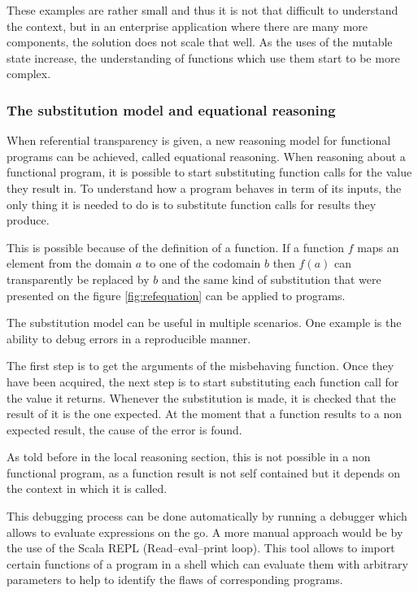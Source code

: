 \documentclass[../main.tex]{subfiles}
\begin{document}


These examples are rather small and thus it is not that difficult to understand
the context, but in an enterprise application where there are many more
components, the solution does not scale that well. As the uses of the mutable
state increase, the understanding of functions which use them start to be more
complex.

\subsubsection{The substitution model and equational reasoning}

When referential transparency is given, a new reasoning model for functional
programs can be achieved, called equational reasoning. When reasoning about a
functional program, it is possible to start substituting function calls for the
value they result in. To understand how a program behaves in term of its inputs,
the only thing it is needed to do is to substitute function calls for results they
produce.

This is possible because of the definition of a function. If a function $f$ maps an
element from the domain $a$ to one of the codomain $b$ then $f(a)$ can
transparently be replaced by $b$ and the same kind of substitution that were
presented on the figure \ref{fig:refequation} can be applied to programs.

The substitution model can be useful in multiple scenarios. One example is the
ability to debug errors in a reproducible manner.

The first step is to get the arguments of the misbehaving function. Once they have been acquired, the next step is to
start substituting each function call for the value it returns. Whenever the
substitution is made, it is checked that the result of it is the one expected. At the
moment that a function results to a non expected result, the cause of the error
is found.

As told before in the local reasoning section, this is not possible in a non
functional program, as a function result is not self contained but it depends on
the context in which it is called.

This debugging process can be done automatically by running a debugger which allows to
evaluate expressions on the go. A more manual approach would be by the use of
the Scala REPL (Read–eval–print loop). This tool allows to import
certain functions of a program in a shell which can evaluate them with arbitrary
parameters to help to identify the flaws of corresponding programs.
\end{document}
